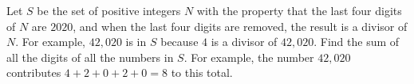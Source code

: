 Let $S$ be the set of positive integers $N$ with the property that the last four digits of $N$ are $2020$, and when the last four digits are removed, the result is a divisor of $N$. For example, $42,020$ is in $S$ because $4$ is a divisor of $42,020$. Find the sum of all the digits of all the numbers in $S$. For example, the number $42,020$ contributes $4+2+0+2+0=8$ to this total.